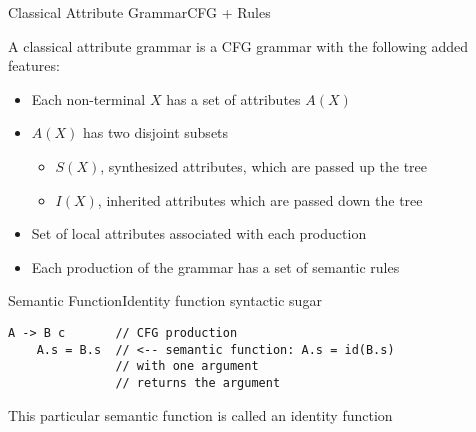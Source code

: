 
\begin{frame}{Classical Attribute Grammar}{CFG + Rules}


A classical attribute grammar is a \alert{CFG grammar} with the following added features:

\begin{itemize}
    \item Each non-terminal $X$ has a set of attributes $A(X)$
    \item $A(X)$ has two disjoint subsets
    \begin{itemize}
        \item $S(X)$, synthesized attributes, which are passed up the tree
        \item $I(X)$, inherited attributes which are passed down the tree
    \end{itemize}
    \item Set of local attributes associated with each production
    \item Each production of the grammar has a set of \alert{semantic rules}
\end{itemize}

\end{frame}






\begin{frame}[fragile=singleslide]{Semantic Function}{Identity function syntactic sugar}

\begin{verbatim}
A -> B c       // CFG production
    A.s = B.s  // <-- semantic function: A.s = id(B.s)
               // with one argument
               // returns the argument
\end{verbatim}

This particular semantic function is called an \alert{identity function}

\end{frame}

